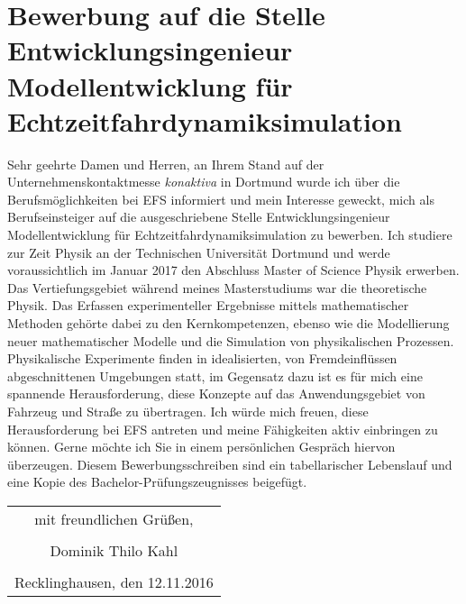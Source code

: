 \documentclass{scrartcl}
\begin{document}
\pagestyle{empty}

\section*{Bewerbung
auf die Stelle\\ Entwicklungsingenieur Modellentwicklung 
für Echtzeitfahrdynamiksimulation}

\vspace{0.5in}

Sehr geehrte Damen und Herren,
\newline\newline
an Ihrem Stand auf der Unternehmenskontaktmesse \textit{konaktiva} in Dortmund wurde  
ich über die Berufsmöglichkeiten bei EFS informiert und mein Interesse geweckt, 
mich als Berufseinsteiger auf die ausgeschriebene Stelle Entwicklungsingenieur 
Modellentwicklung 
für Echtzeitfahrdynamiksimulation zu bewerben.
\newline\newline
Ich studiere zur Zeit Physik an der Technischen Universität Dortmund und werde 
voraussichtlich im Januar 2017 den Abschluss Master of Science Physik erwerben.
Das Vertiefungsgebiet während meines Masterstudiums war die theoretische 
Physik. Das Erfassen experimenteller Ergebnisse mittels ma\-the\-ma\-tischer 
Methoden gehörte dabei zu den Kernkompetenzen, ebenso wie die Mo\-del\-lie\-rung neuer mathematischer Modelle und die Simulation von phy\-si\-ka\-li\-schen 
Prozessen. 
Physikalische Experimente finden in idealisierten, von Fremdeinflüssen  
abgeschnittenen Umgebungen statt, im Gegensatz dazu ist es für mich eine 
spannende 
Herausforderung, diese Konzepte auf das Anwendungsgebiet von Fahrzeug und 
Straße zu übertragen. 
Ich würde mich freuen, diese Herausforderung bei EFS 
antreten und meine Fähigkeiten aktiv einbringen zu können. 
Gerne möchte ich Sie in einem persönlichen Gespräch hiervon überzeugen.
\newline\newline
Diesem Bewerbungsschreiben sind ein tabellarischer Lebenslauf und eine Kopie 
des Bachelor-Prüfungszeugnisses beigefügt.
\newline\newline\newline
\begin{flushright}
\begin{tabular}{c}
mit freundlichen Grüßen, \\ \\
Dominik Thilo Kahl \\ \\
Recklinghausen, den 12.11.2016 \\
\end{tabular}
\end{flushright}
\end{document}

